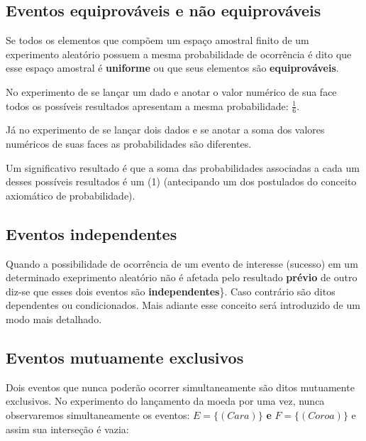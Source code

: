 \documentclass[
]{book}
\begin{document}
\hypertarget{eventos-equiprovuxe1veis-e-nuxe3o-equiprovuxe1veis}{%
\subsection{Eventos equiprováveis e não equiprováveis}\label{eventos-equiprovuxe1veis-e-nuxe3o-equiprovuxe1veis}}

\hfill\break

Se todos os elementos que compõem um espaço amostral finito de um experimento aleatório possuem a mesma probabilidade de ocorrência é dito que esse espaço amostral é \textbf{uniforme} ou que seus elementos são \textbf{equiprováveis}.

No experimento de se lançar um dado e anotar o valor numérico de sua face todos os possíveis resultados apresentam a mesma probabilidade: \(\frac{1}{6}\).

Já no experimento de se lançar dois dados e se anotar a soma dos valores numéricos de suas faces as probabilidades são diferentes.

Um significativo resultado é que a soma das probabilidades associadas a cada um desses possíveis resultados é um (1) (antecipando um dos postulados do conceito axiomático de probabilidade).

\hypertarget{eventos-independentes}{%
\subsection{Eventos independentes}\label{eventos-independentes}}

Quando a possibilidade de ocorrência de um evento de interesse (sucesso) em um determinado exeprimento aleatório não é afetada pelo resultado \textbf{prévio} de outro diz-se que esses dois eventos são \textbf{independentes}\}. Caso contrário são ditos dependentes ou condicionados. Mais adiante esse conceito será introduzido de um modo mais detalhado.

\hypertarget{eventos-mutuamente-exclusivos}{%
\subsection{Eventos mutuamente exclusivos}\label{eventos-mutuamente-exclusivos}}

Dois eventos que nunca poderão ocorrer simultaneamente são ditos mutuamente exclusivos. No experimento do lançamento da moeda por uma vez, nunca observaremos simultaneamente os eventos: \(E=\{(Cara)\}\) \textbf{e} \(F=\{(Coroa)\}\) e assim sua interseção é vazia:
\end{document}
